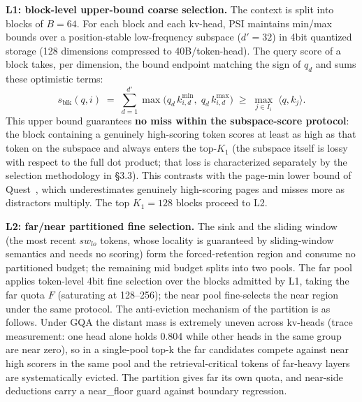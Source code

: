 \documentclass[11pt]{article}
\begin{document}
\textbf{L1: block-level upper-bound coarse selection.} The context is split into blocks of $B{=}64$. For each block and each kv-head, PSI maintains min/max bounds over a position-stable low-frequency subspace ($d'{=}32$) in 4bit quantized storage (128 dimensions compressed to 40B/token-head). The query score of a block takes, per dimension, the bound endpoint matching the sign of $q_d$ and sums these optimistic terms:
\begin{equation}
s_{\mathrm{blk}}(q, i) \;=\; \sum_{d=1}^{d'} \max\!\big(q_d\, k^{\min}_{i,d},\; q_d\, k^{\max}_{i,d}\big)\;\geq\; \max_{j\in I_i}\; \langle q, k_j \rangle.
\end{equation}
This upper bound guarantees \textbf{no miss within the subspace-score protocol}: the block containing a genuinely high-scoring token scores at least as high as that token on the subspace and always enters the top-$K_1$ (the subspace itself is lossy with respect to the full dot product; that loss is characterized separately by the selection methodology in \S3.3). This contrasts with the page-min lower bound of Quest~\cite{quest}, which underestimates genuinely high-scoring pages and misses more as distractors multiply. The top $K_1{=}128$ blocks proceed to L2.

\textbf{L2: far/near partitioned fine selection.} The sink and the sliding window (the most recent $sw_{lo}$ tokens, whose locality is guaranteed by sliding-window semantics and needs no scoring) form the forced-retention region and consume no partitioned budget; the remaining mid budget splits into two pools. The far pool applies token-level 4bit fine selection over the blocks admitted by L1, taking the far quota $F$ (saturating at 128--256); the near pool fine-selects the near region under the same protocol. The anti-eviction mechanism of the partition is as follows. Under GQA the distant mass is extremely uneven across kv-heads (trace measurement: one head alone holds 0.804 while other heads in the same group are near zero), so in a single-pool top-k the far candidates compete against near high scorers in the same pool and the retrieval-critical tokens of far-heavy layers are systematically evicted. The partition gives far its own quota, and near-side deductions carry a near\_floor guard against boundary regression.
\end{document}
